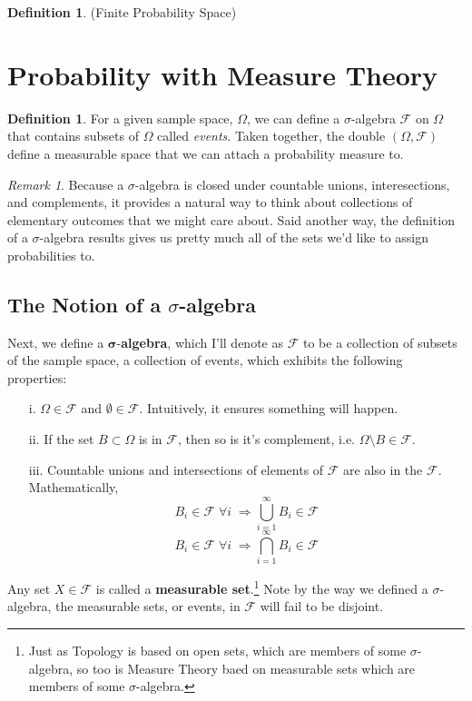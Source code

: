 \documentclass[a4paper,12pt]{article}
\theoremstyle{plain}
\theoremstyle{definition}
\newtheorem{defn}[thm]{Definition}
\theoremstyle{remark}
\newtheorem*{rmk}{Remark}
\begin{document}
\begin{defn}{(Finite Probability Space)}
\end{defn}



\section{Probability with Measure Theory}


\begin{defn}
For a given sample space, $\Omega$, we can define a $\sigma$-algebra
$\mathscr{F}$ on $\Omega$ that contains subsets of $\Omega$ called
\emph{events}. Taken together, the double $(\Omega,\mathscr{F})$ define
a measurable space that we can attach a probability measure to.
\end{defn}
\begin{rmk}
Because a $\sigma$-algebra is closed under countable unions,
interesections, and complements, it provides a natural way to think
about collections of elementary outcomes that we might care about. Said
another way, the definition of a $\sigma$-algebra results gives us
pretty much all of the sets we'd like to assign probabilities to.
\end{rmk}

\subsection{The Notion of a $\sigma$-algebra}

Next, we define a $\mathbf{\sigma}$-\textbf{algebra},
which I'll denote as
$\mathcal{F}$ to be a collection of subsets of the sample space, a
collection of events, which
exhibits the following properties:
\begin{itemize}
   \item[i.] $\Omega \in \mathcal{F}$ and $\emptyset \in \mathcal{F}$.
      Intuitively, it ensures something will happen.
   \item[ii.] If the set $B \subset \Omega$ is in $\mathcal{F}$,
      then so is it's complement, i.e. $\Omega \setminus B \in
      \mathcal{F}$.
   \item[iii.] Countable unions and intersections of elements of
      $\mathcal{F}$ are also in the $\mathcal{F}$.  Mathematically,
      \[ B_i \in \mathcal{F} \; \forall i \; \Rightarrow
	 \bigcup_{i=1}^{\infty} B_i \in \mathcal{F} \]
      \[ B_i \in \mathcal{F} \; \forall i \; \Rightarrow
	 \bigcap_{i=1}^{\infty} B_i \in \mathcal{F} \]
\end{itemize}
Any set $X \in \mathcal{F}$ is called a
\textbf{measurable set}.\footnote{Just as Topology is based on open
sets, which are members of some $\sigma$-algebra, so too is Measure
Theory baed on measurable sets which are members of some
$\sigma$-algebra.} Note by the way we defined a $\sigma$-algebra,
the measurable sets, or events, in $\mathcal{F}$ will fail to be
disjoint.
\end{document}
